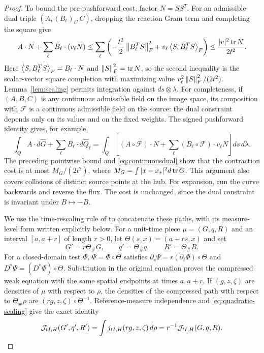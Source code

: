 \begin{proof}
To bound the pre-pushforward cost, factor $N=SS^T$. For an admissible
dual triple $(A,(B_\ell)_\ell,C)$, dropping the reaction Gram term and
completing the square give
\[
 A\cdot N+\sum_\ell B_\ell\cdot(v_\ell N)
 \le\sum_\ell\left(-\frac{t^2}{2}\left\lVert B_\ell^TS\right\rVert_F^2
       +v_\ell\left\langle S,B_\ell^TS\right\rangle_F\right)
 \le\frac{|v|^2\operatorname{tr} N}{2t^2}.
\]
Here $\left\langle S,B_\ell^TS\right\rangle_F=B_\ell\cdot N$ and
$\left\lVert S\right\rVert_F^2=\operatorname{tr} N$, so the second inequality is the scalar-vector square
completion with maximizing value $v_\ell^2\left\lVert S\right\rVert_F^2/(2t^2)$.
Lemma~\ref{lem:scaling} permits integration against $ds\otimes\lambda$.
For completeness, if $(A,B,C)$ is any continuous admissible field on the
image space, its composition with $\mathcal F$ is a continuous admissible
field on the source: the dual constraint depends only on its values and
on the fixed weights. The signed pushforward identity gives, for example,
\[
 \int_Q A\cdot d\widehat G+\sum_\ell B_\ell\cdot d\widehat Q_\ell
 =\int_Q\left[(A\circ\mathcal F)\cdot N+
      \sum_\ell(B_\ell\circ\mathcal F)\cdot v_\ell N\right]ds\,d\lambda.
\]
The preceding pointwise bound and \eqref{eq:continuousdual} show that the
contraction cost is at most $M_G/(2t^2)$, where
$M_G=\int|x-x_*|^2d\operatorname{tr} G$. This argument also covers collisions of distinct
source points at the hub.
For expansion, run the curve backwards and reverse the flux. The cost is
unchanged, since the dual constraint is invariant under $B\mapsto-B$.

We use the time-rescaling rule of \cite[Lemma 3.15]{LiZou} to concatenate
these paths, with its measure-level form written explicitly below.
For a unit-time piece $\mu=(G,q,R)$ and an interval $[a,a+r]$ of length
$r>0$, let $\Theta(s,x)=(a+rs,x)$ and set
\[
 G'=r\Theta_\#G,\qquad q'=\Theta_\#q,\qquad R'=\Theta_\#R.
\]
For a closed-domain test $\Phi$, $\Psi=\Phi\circ\Theta$ satisfies
$\partial_s\Psi=r(\partial_t\Phi)\circ\Theta$ and
$D^*\Psi=(D^*\Phi)\circ\Theta$. Substitution in the original equation
proves the compressed weak equation with the same spatial endpoints at
times $a,a+r$. If $(g,z,\zeta)$ are densities of $\mu$ with respect to
$\rho$, the densities of the compressed path with respect to
$\Theta_\#\rho$ are $(rg,z,\zeta)\circ\Theta^{-1}$. Reference-measure
independence and \eqref{eq:quadratic-scaling} give the exact identity
\[
 \mathcal J_{tI,H}(G',q',R')
 =\int j_{tI,H}(rg,z,\zeta)\,d\rho
 =r^{-1}\mathcal J_{tI,H}(G,q,R).
\]


\end{proof}

